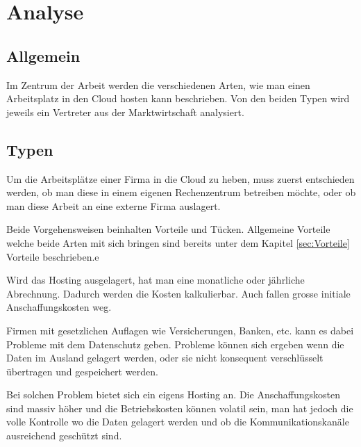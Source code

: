 

\chapter{Analyse}

\section{Allgemein}
	
Im Zentrum der Arbeit werden die verschiedenen Arten, wie man einen Arbeitsplatz in den Cloud hosten kann beschrieben. Von den beiden Typen wird jeweils ein Vertreter aus der Marktwirtschaft analysiert.

\section{Typen}
Um die Arbeitsplätze einer Firma in die Cloud zu heben, muss zuerst entschieden werden, ob man diese in einem eigenen Rechenzentrum betreiben möchte, oder ob man diese Arbeit an eine externe Firma auslagert. 

Beide Vorgehensweisen beinhalten Vorteile und Tücken. Allgemeine Vorteile welche beide Arten mit sich bringen sind bereits unter dem Kapitel \ref{sec:Vorteile} Vorteile beschrieben.e 

Wird das Hosting ausgelagert, hat man eine monatliche oder jährliche Abrechnung. Dadurch werden die Kosten kalkulierbar. Auch fallen grosse initiale Anschaffungskosten weg.

Firmen mit gesetzlichen Auflagen wie Versicherungen, Banken, etc. kann es dabei Probleme mit dem Datenschutz geben. Probleme können sich ergeben wenn die Daten im Ausland gelagert werden, oder sie nicht konsequent verschlüsselt übertragen und gespeichert werden.

Bei solchen Problem bietet sich ein eigens Hosting an. Die Anschaffungskosten sind massiv höher und die Betriebskosten können volatil sein, man hat jedoch die volle Kontrolle wo die Daten gelagert werden und ob die Kommunikationskanäle ausreichend geschützt sind.

